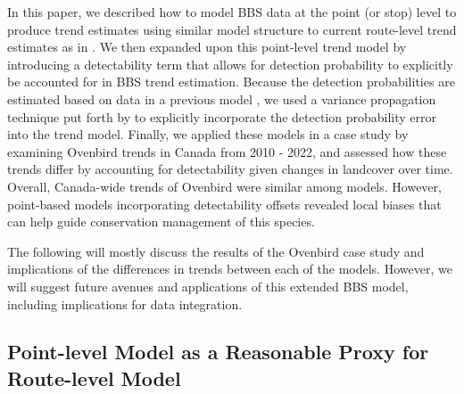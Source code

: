 \par In this paper, we described how to model BBS data at the point (or stop) level to produce trend estimates using similar model structure to current route-level trend estimates as in \citet{smith_spatially_2023}.
We then expanded upon this point-level trend model by introducing a detectability term that allows for detection probability to explicitly be accounted for in BBS trend estimation.
Because the detection probabilities are estimated based on data in a previous model \citep{edwards_point_2023}, we used a variance propagation technique put forth by \citet{bravington_variance_2021} to explicitly incorporate the detection probability error into the trend model.
Finally, we applied these models in a case study by examining Ovenbird trends in Canada from 2010 - 2022, and assessed how these trends differ by accounting for detectability given changes in landcover over time.
Overall, Canada-wide trends of Ovenbird were similar among models.
However, point-based models incorporating detectability offsets revealed local biases that can help guide conservation management of this species.

\par The following will mostly discuss the results of the Ovenbird case study and implications of the differences in trends between each of the models.
However, we will suggest future avenues and applications of this extended BBS model, including implications for data integration.

\subsection{Point-level Model as a Reasonable Proxy for Route-level Model}

